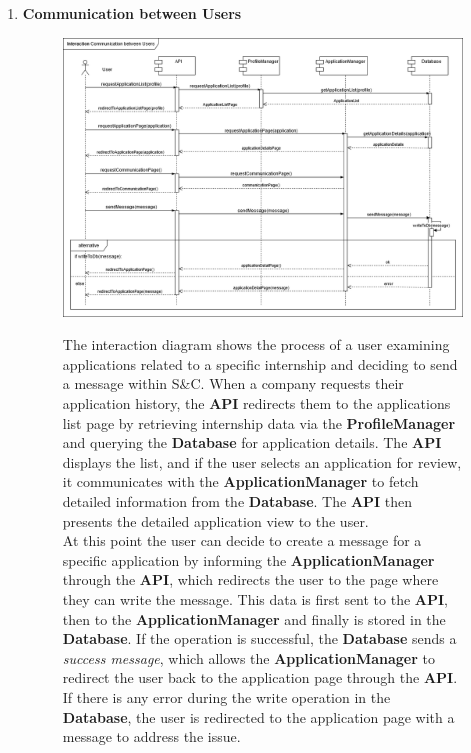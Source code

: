 \begin{enumerate}
    \newpage
    \item \textbf{Communication between Users}
    \begin{figure}[h!]
            \centering  \includegraphics[width=1\textwidth]{DD/Images/Interactions/INT17_ CommunicationBetweenUsers.drawio.png}
            \label{fig:ComponentViewDiagram}
            \caption*{
            The interaction diagram shows the process of a user examining applications related to a specific internship and deciding to send a message within S\&C. When a company requests their application history, the \textbf{API} redirects them to the applications list page by retrieving internship data via the \textbf{ProfileManager} and querying the \textbf{Database} for application details. The \textbf{API} displays the list, and if the user selects an application for review, it communicates with the \textbf{ApplicationManager} to fetch detailed information from the \textbf{Database}. The \textbf{API} then presents the detailed application view to the user.
            \\At this point the user can decide to create a message for a specific application by informing the \textbf{ApplicationManager} through the \textbf{API}, which redirects the user to the page where they can write the message. This data is first sent to the \textbf{API}, then to the \textbf{ApplicationManager} and finally is stored in the \textbf{Database}. 
            If the operation is successful, the \textbf{Database} sends a \textit{success message}, which allows the \textbf{ApplicationManager} to redirect the user back to the application page through the \textbf{API}. 
            If there is any error during the write operation in the \textbf{Database}, the user is redirected to the application page with a message to address the issue.
            }
    \end{figure}
    

\end{enumerate}
